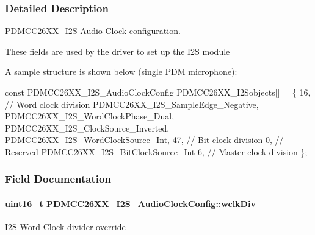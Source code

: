 \subsubsection{Detailed Description}
P\+D\+M\+C\+C26\+X\+X\+\_\+\+I2\+S Audio Clock configuration. 

These fields are used by the driver to set up the I2\+S module

A sample structure is shown below (single P\+D\+M microphone)\+: 
\begin{DoxyCode}
\textcolor{keyword}{const} PDMCC26XX_I2S_AudioClockConfig PDMCC26XX\_I2Sobjects[] = \{
        16, \textcolor{comment}{// Word clock division}
        PDMCC26XX_I2S_SampleEdge_Negative,
        PDMCC26XX_I2S_WordClockPhase_Dual,
        PDMCC26XX_I2S_ClockSource_Inverted,
        PDMCC26XX_I2S_WordClockSource_Int,
        47, \textcolor{comment}{// Bit clock division}
        0, \textcolor{comment}{// Reserved}
        PDMCC26XX_I2S_BitClockSource_Int
        6, \textcolor{comment}{// Master clock division}
\};
\end{DoxyCode}
 

\subsubsection{Field Documentation}
\paragraph[{wclk\+Div}]{\setlength{\rightskip}{0pt plus 5cm}uint16\+\_\+t P\+D\+M\+C\+C26\+X\+X\+\_\+\+I2\+S\+\_\+\+Audio\+Clock\+Config\+::wclk\+Div}\label{struct_p_d_m_c_c26_x_x___i2_s___audio_clock_config_ade00c43db3086dd3ecefb9fe7ccd3388}
I2\+S Word Clock divider override 
